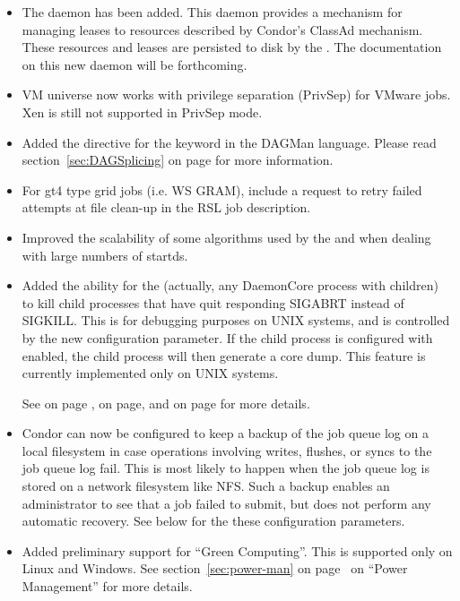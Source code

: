 \begin{itemize}
\item The  daemon has been added.  This daemon
  provides a mechanism for managing leases to resources described by
  Condor's ClassAd mechanism.  These resources and leases are
  persisted to disk by the .  The documentation
  on this new daemon will be forthcoming.

\item VM universe now works with privilege separation (PrivSep)
for VMware jobs. Xen is still not supported in PrivSep mode.

\item Added the  directive for the  keyword in
the DAGMan language.
Please read section~\ref{sec:DAGSplicing} on page \pageref{sec:DAGSplicing} for
more information.

\item For gt4 type grid jobs (i.e. WS GRAM), include a request to retry
failed attempts at file clean-up in the RSL job description.

\item Improved the scalability of some algorithms used by the
 and  when dealing with large
numbers of startds.

\item Added the ability for the  (actually, any
  DaemonCore process with children) to kill child
  processes that have quit responding SIGABRT instead of SIGKILL.
  This is for debugging purposes on UNIX systems, and is controlled by
  the new  configuration
  parameter.  If the child process is configured with
   enabled, the child process will then
  generate a core dump.
  This feature is currently implemented only on UNIX systems.

  See
  on page \pageref{param:NotRespondingWantCore},
  on page\pageref{param:NotRespondingTimeout},
  and
  on page \pageref{param:CreateCoreFiles}
  for more details.

\item Condor can now be configured to keep a backup of the job queue
  log on a local filesystem in case  operations
  involving writes, flushes, or syncs to the job queue log fail.  This
  is most likely to happen when the job queue log is stored on a
  network filesystem like NFS. Such a backup enables an administrator
  to see that a job failed to submit, but does not perform any
  automatic recovery.  See below for the these configuration parameters.

\item Added preliminary support for ``Green Computing''.  This is
  supported only on Linux and Windows.
  See section~\ref{sec:power-man} on page~\pageref{sec:power-man} on
  ``Power Management'' for more details.

\end{itemize}

